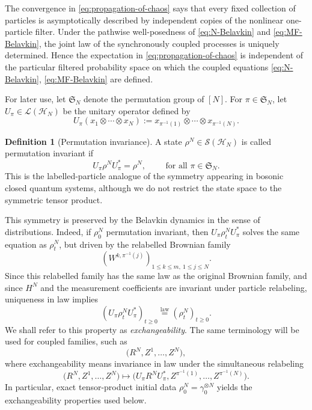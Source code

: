 \documentclass[10pt,a4paper,reqno]{amsart}
\numberwithin{equation}{section}
\theoremstyle{plain}
\theoremstyle{definition}
\newtheorem{definition}[theorem]{Definition}
\theoremstyle{remark}
\newcommand{\cS}{\mathcal S}
\newcommand{\cL}{\mathcal L}
\newcommand{\HH}{\mathcal H}
\newcommand{\1}{\mathbf 1}
\begin{document}
The convergence in \eqref{eq:propagation-of-chaos} says that every fixed
collection of particles is asymptotically described by independent copies of the
nonlinear one-particle filter.  Under the pathwise well-posedness of \eqref{eq:N-Belavkin} and  \eqref{eq:MF-Belavkin},  the
joint law of the synchronously coupled processes is uniquely determined.  Hence
the expectation in \eqref{eq:propagation-of-chaos} is independent of the
particular filtered probability space on which the coupled equations  \eqref{eq:N-Belavkin},  \eqref{eq:MF-Belavkin} are
defined.

\medskip

For later use, let $\mathfrak S_N$ denote the permutation group of $[N]$.
For $\pi\in\mathfrak S_N$, let $U_\pi\in\cL(\HH_N)$ be the unitary operator 
defined by
\[
  U_\pi(x_1\otimes\cdots\otimes x_N)
  :=
  x_{\pi^{-1}(1)}\otimes\cdots\otimes x_{\pi^{-1}(N)}.
\]
\begin{definition}[Permutation invariance]
\label{def:exchangeability}
A  state $\rho^N\in\cS(\HH_N)$ is called permutation invariant if 
\[
  U_\pi\rho^N U_\pi^*=\rho^N,
  \qquad
  \mbox{ for all } \pi\in\mathfrak S_N.
\]
This is the labelled-particle analogue of the symmetry appearing in bosonic
closed quantum systems, although we do not restrict the state space to the symmetric
tensor product.
\end{definition}


This symmetry is preserved by the Belavkin dynamics in the sense of distributions.  Indeed, if
$\rho_0^N$ permutation invariant, then
$U_\pi\rho_t^N U_\pi^*$ solves the same equation as $\rho_t^N$, but driven by
the relabelled Brownian family
\[
  (W^{k,\pi^{-1}(j)})_{1\le k\le m,\ 1\le j\le N}.
\]
Since this relabelled family has the same law as the original Brownian family,
and since $H^N$ and the measurement coefficients are invariant under particle
relabeling, uniqueness in law implies
\[
  (U_\pi\rho_t^N U_\pi^*)_{t\ge0}
  \stackrel{\mathrm{law}}{=}
  (\rho_t^N)_{t\ge0}.
\]
We shall refer to this property as \emph{exchangeability}.  The same terminology will
be used for coupled families, such as
\[
  \bigl(R^N,Z^1,\ldots,Z^N\bigr),
\]
where exchangeability means invariance in law under the simultaneous relabeling
\[
  \bigl(R^N,Z^1,\ldots,Z^N\bigr)
  \longmapsto
  \bigl(U_\pi R^N U_\pi^*,Z^{\pi^{-1}(1)},\ldots,Z^{\pi^{-1}(N)}\bigr).
\]
In particular, exact tensor-product initial data
$\rho_0^N=\gamma_0^{\otimes N}$ yields the exchangeability properties used
below.
\end{document}
